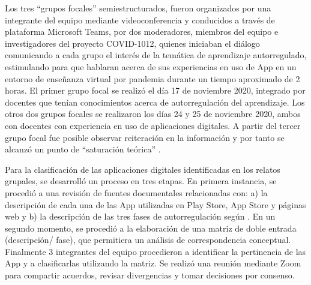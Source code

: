 \documentclass[spanish]{textolivre}
\begin{document}
Los tres “grupos focales” semiestructurados, fueron organizados por una integrante del equipo mediante videoconferencia y  conducidos a través de  plataforma Microsoft Teams, por dos moderadores, miembros del equipo e  investigadores del proyecto COVID-1012, quienes iniciaban el diálogo comunicando  a cada grupo el interés de la temática de aprendizaje autorregulado, estimulando para que hablaran acerca de sus experiencias en uso de App en un entorno de enseñanza virtual por pandemia  durante un tiempo aproximado de 2 horas. El primer grupo focal se realizó el día 17 de noviembre 2020, integrado por docentes que tenían  conocimientos acerca  de  autorregulación del aprendizaje. Los otros dos  grupos focales se realizaron los días 24 y 25 de noviembre 2020, ambos con docentes con experiencia en uso de aplicaciones digitales. A partir del tercer grupo focal fue posible observar  reiteración en la información y por tanto se alcanzó un punto de  “saturación teórica” \cite{glaser1967}.

Para la clasificación de las aplicaciones digitales identificadas en los relatos grupales, se desarrolló un proceso en tres etapas. En primera instancia, se procedió a una revisión de fuentes documentales relacionadas con: a) la descripción de cada una de las App utilizadas en Play Store, App Store y páginas web y  b) la  descripción de las tres fases  de autorregulación según \textcite{zimmerman2013}. En un segundo momento, se procedió a la elaboración de una matriz de doble entrada (descripción/ fase), que permitiera un análisis de correspondencia conceptual. Finalmente 3 integrantes del equipo procedieron a identificar la pertinencia de las App y a clasificarlas utilizando la matriz. Se realizó una reunión mediante Zoom para compartir acuerdos, revisar divergencias y tomar decisiones por consenso. 
\end{document}
